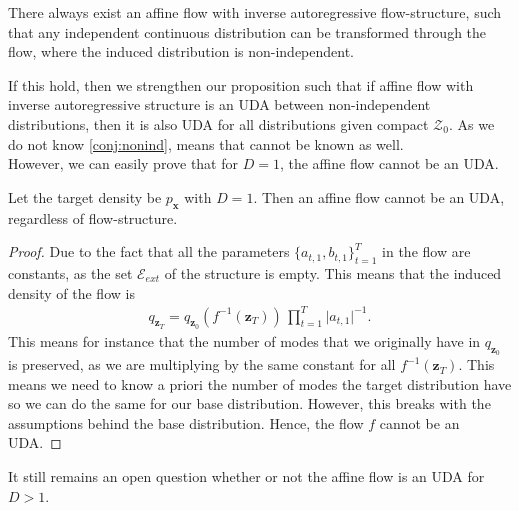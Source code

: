 \begin{conjecture}\label{conj:nonind}
    There always exist an affine flow with inverse autoregressive flow-structure, 
    such that any independent continuous distribution 
    can be transformed through the flow, where the induced distribution is non-independent.
\end{conjecture}
If this hold, then we strengthen our proposition such that if affine flow with inverse autoregressive structure is an UDA between
non-independent distributions, then it is also UDA for all distributions given compact \(\mathcal{Z}_0\). As we do not know
\cref{conj:nonind}, means that \cite{wehenkel} cannot be known as well.\\

However, we can easily prove that for \(D=1\), the affine flow cannot be an UDA. 
\begin{proposition}
    Let the target density be \(p_{\bm x}\) with \(D = 1\). Then an affine flow cannot be 
    an UDA, regardless of flow-structure.
\end{proposition}
\begin{proof}
    Due to the fact that all the parameters \(\{a_{t,1}, b_{t,1}\}^{T}_{t=1}\) in the flow are constants, as the set
    \(\mathcal{E}_{ext}\) of the structure is empty. This means that the induced density of the flow is
    \begin{align*}
        q_{\bm z_T} = q_{\bm z_0}(f^{-1}(\bm z_T)) \, \prod_{t=1}^T \lvert a_{t,1} \rvert^{-1}.
    \end{align*}
    This means for instance that the number of modes that we originally have in \(q_{\bm z_0}\) is preserved, as we 
    are multiplying by the same constant for all \(f^{-1}(\bm z_{T})\). This means we need to know a priori the 
    number of modes the target distribution have so we can do the same for our base distribution. However, this breaks
    with the assumptions behind the base distribution. Hence, the flow \(f\) cannot be an UDA.
\end{proof}

It still remains an open question whether or not the affine flow is an UDA for \(D > 1\). 


